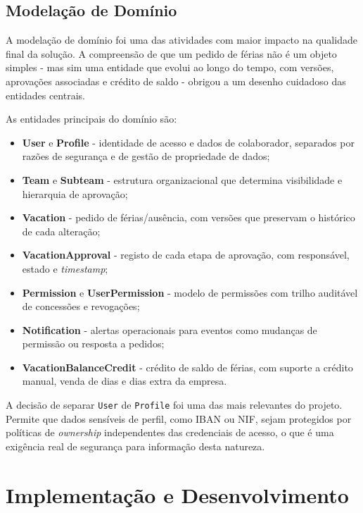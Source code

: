 \documentclass[12pt, a4paper, twoside, openright]{report}
\begin{document}
\subsection{Modelação de Domínio}

A modelação de domínio foi uma das atividades com maior impacto na qualidade final
da solução. A compreensão de que um pedido de férias não é um objeto simples -
mas sim uma entidade que evolui ao longo do tempo, com versões, aprovações associadas
e crédito de saldo - obrigou a um desenho cuidadoso das entidades centrais.

As entidades principais do domínio são:

\begin{itemize}
  \item \textbf{User} e \textbf{Profile} - identidade de acesso e dados de colaborador,
        separados por razões de segurança e de gestão de propriedade de dados;
  \item \textbf{Team} e \textbf{Subteam} - estrutura organizacional que determina
        visibilidade e hierarquia de aprovação;
  \item \textbf{Vacation} - pedido de férias/ausência, com versões que preservam
        o histórico de cada alteração;
  \item \textbf{VacationApproval} - registo de cada etapa de aprovação, com responsável,
        estado e \textit{timestamp};
  \item \textbf{Permission} e \textbf{UserPermission} - modelo de permissões com
        trilho auditável de concessões e revogações;
  \item \textbf{Notification} - alertas operacionais para eventos como mudanças de
        permissão ou resposta a pedidos;
  \item \textbf{VacationBalanceCredit} - crédito de saldo de férias, com suporte a
        crédito manual, venda de dias e dias extra da empresa.
\end{itemize}

A decisão de separar \texttt{User} de \texttt{Profile} foi uma das mais relevantes do
projeto. Permite que dados sensíveis de perfil, como IBAN ou NIF, sejam
protegidos por políticas de \textit{ownership} independentes das credenciais de acesso,
o que é uma exigência real de segurança para informação desta natureza.

\section{Implementação e Desenvolvimento}
\end{document}
